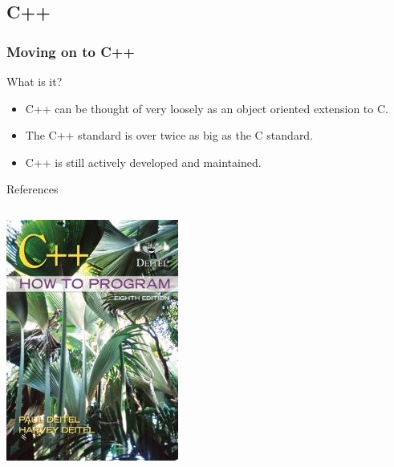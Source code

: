 \documentclass[smaller,handout,table]{beamer}
\begin{document}
\subsection{C++}
\begin{frame}
\frametitle{Moving on to C++}
\begin{block}{What is it?}
\begin{itemize}
\item C++ can be thought of very loosely as an object oriented extension to C.
\item The C++ standard is over twice as big as the C standard.
\item C++ is still actively developed and maintained.
\end{itemize}
\end{block}
\begin{exampleblock}{References}
\begin{columns}
\begin{column}{1.7cm}
\includegraphics[width=\textwidth]{deitelnew.jpg}

\end{column}
\end{columns}
\end{exampleblock}
\end{frame}
\end{document}

